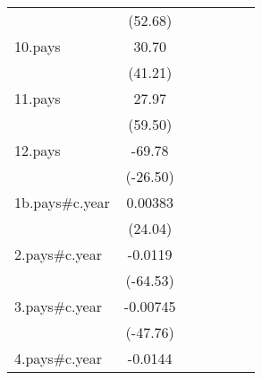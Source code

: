 {\begin{tabular}{l*{6}{c}}
                    &     (52.68)         &                     &                     &                     &                     &                     \\
[1em]
10.pays             &       30.70\sym{***}&                     &                     &                     &                     &                     \\
                    &     (41.21)         &                     &                     &                     &                     &                     \\
[1em]
11.pays             &       27.97\sym{***}&                     &                     &                     &                     &                     \\
                    &     (59.50)         &                     &                     &                     &                     &                     \\
[1em]
12.pays             &      -69.78\sym{***}&                     &                     &                     &                     &                     \\
                    &    (-26.50)         &                     &                     &                     &                     &                     \\
[1em]
1b.pays#c.year      &     0.00383\sym{***}&                     &                     &                     &                     &                     \\
                    &     (24.04)         &                     &                     &                     &                     &                     \\
[1em]
2.pays#c.year       &     -0.0119\sym{***}&                     &                     &                     &                     &                     \\
                    &    (-64.53)         &                     &                     &                     &                     &                     \\
[1em]
3.pays#c.year       &    -0.00745\sym{***}&                     &                     &                     &                     &                     \\
                    &    (-47.76)         &                     &                     &                     &                     &                     \\
[1em]
4.pays#c.year       &     -0.0144\sym{***}&                     &                     &                     &                     &                     \\

\end{tabular}}
